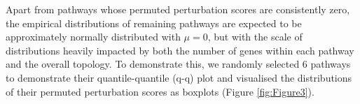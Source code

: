 \documentclass[9pt,a4paper,]{extarticle}
\newenvironment{Shaded}{\begin{snugshade}}{\end{snugshade}}
\newcommand{\AttributeTok}[1]{\textcolor[rgb]{0.13,0.29,0.53}{#1}}
\newcommand{\FunctionTok}[1]{\textcolor[rgb]{0.13,0.29,0.53}{\textbf{#1}}}
\newcommand{\NormalTok}[1]{#1}
\newcommand{\OtherTok}[1]{\textcolor[rgb]{0.56,0.35,0.01}{#1}}
\newcommand{\SpecialCharTok}[1]{\textcolor[rgb]{0.81,0.36,0.00}{\textbf{#1}}}
\begin{document}
\begin{Shaded}
\end{Shaded}

Apart from pathways whose permuted perturbation scores are consistently zero, the empirical distributions of remaining pathways are expected to be approximately normally distributed with \(\mu = 0\), but with the scale of distributions heavily impacted by both the number of genes within each pathway and the overall topology.
To demonstrate this, we randomly selected 6 pathways to demonstrate their quantile-quantile (q-q) plot and visualised the distributions of their permuted perturbation scores as boxplots (Figure \ref{fig:Figure3}).
\end{document}
